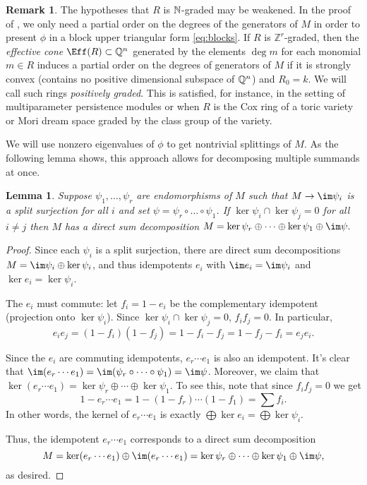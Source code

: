 \documentclass[12pt]{article}
\def\ZZ{\mathbb Z}
\theoremstyle{theorem}
\numberwithin{thm}{section}
\newtheorem{lem}[thm]{Lemma}
\theoremstyle{definition}
\newtheorem{rem}[thm]{Remark}
\begin{document}
\begin{rem}\label{rem:grading}
  The hypotheses that $R$ is $\mathbb N$-graded may be weakened. In the proof of , we only need a partial order on the degrees of the generators of $M$ in order to present $\phi$ in a block upper triangular form \eqref{eq:blocks}. If $R$ is $\ZZ^r$-graded, then the \emph{effective cone} $\Eff(R)\subset\Q^n$ generated by the elements $\deg m$ for each monomial $m \in R$ induces a partial order on the degrees of generators of $M$ if it is strongly convex (contains no positive dimensional subspace of $\mathbb Q^n$) and $R_0 = k$. We will call such rings \emph{positively graded}. %
  This is satisfied, for instance, in the setting of multiparameter persistence modules or when $R$ is the Cox ring of a toric variety or Mori dream space graded by the class group of the variety.
\end{rem}

We will use nonzero eigenvalues of $\phi$ to get nontrivial splittings of $M$. As the following lemma shows, this approach allows for decomposing multiple summands at once.

\begin{lem}\label{lem:decomposition}
  Suppose $\psi_1,\dots,\psi_r$ are endomorphisms of $M$ such that $M\to\im\psi_i$ is a split surjection for all $i$ and set $\psi = \psi_r\circ\dots\circ\psi_1$.
  If $\ker\psi_i\cap\ker \psi_j = 0$ for all $i\neq j$ then $M$ has a direct sum decomposition \( M = \ker\psi_r \oplus \cdots \oplus \ker\psi_1 \oplus \im\psi. \)
\end{lem}
\begin{proof}
  Since each $\psi_i$ is a split surjection, there are direct sum decompositions $M=\im \psi_i \oplus \ker \psi_i$, and thus idempotents $e_i$ with $\im e_i = \im \psi_i$ and $\ker e_i = \ker \psi_i$.

  The $e_i$ must commute: let $f_i = 1- e_i$ be the complementary idempotent (projection onto $\ker \psi_i$). Since $\ker \psi_i \cap \ker \psi_j=0$, $f_if_j=0$. In particular,
  \[ e_ie_j =(1-f_i)(1-f_j) = 1-f_i-f_j= 1-f_j-f_i = e_j e_i. \]

  Since the $e_i$ are commuting idempotents, $e_r\cdots e_1$ is also an idempotent. It's clear that $\im(e_r\cdots e_1) = \im (\psi_r\circ \dots\circ \psi_1) = \im \psi$. Moreover, we claim that $\ker(e_r\cdots e_1) = \ker \psi_r \oplus \cdots \oplus \ker \psi_1$. To see this, note that since $f_if_j=0$ we get
  \[ 1-e_r\cdots e_1 = 1-(1-f_r)\cdots (1-f_1) = \sum f_i. \]
  In other words, the kernel of $e_r\cdots e_1$ is exactly $\bigoplus \ker e_i =\bigoplus \ker \psi_i$.

  Thus, the idempotent $e_r\cdots e_1$ corresponds to a direct sum decomposition
  \[ M = \ker(e_r\cdots e_1) \oplus \im(e_r\cdots e_1) = \ker\psi_r \oplus \cdots \oplus \ker\psi_1 \oplus \im\psi, \]
  as desired.
\end{proof}
\end{document}
